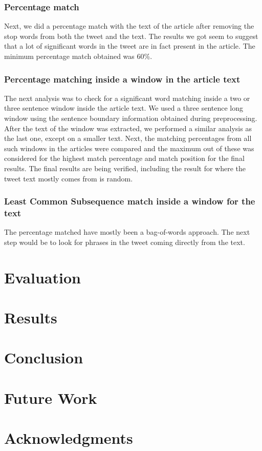\documentclass[11pt]{article}
\begin{document}
\subsubsection{Percentage match}

Next, we did a percentage match with the text of the article after removing the stop words from both the tweet and the text. The results we got seem to suggest that a lot of significant words in the tweet are in fact present in the article. The minimum percentage match obtained was 60\%.

\subsubsection{Percentage matching inside a window in the article text}

The next analysis was to check for a significant word matching inside a two or three sentence window inside the article text. We used a three sentence long window using the sentence boundary information obtained during preprocessing. After the text of the window was extracted, we performed a similar analysis as the last one, except on a smaller text. Next, the matching percentages from all such windows in the articles were compared and the maximum out of these was considered for the highest match percentage and match position for the final results. The final results are being verified, including the result for where the tweet text mostly comes from is random.

\subsubsection{Least Common Subsequence match inside a window for the text}

The percentage matched have mostly been a bag-of-words approach. The next step would be to look for phrases in the tweet coming directly from the text.

\section{Evaluation}

\section{Results}

\section{Conclusion}

\section{Future Work}

\section*{Acknowledgments}




\end{document}
